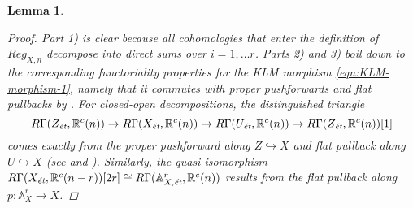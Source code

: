 \documentclass[10pt,a4paper,oneside]{article}
\newcommand{\RR}{\mathbb{R}}
\renewcommand{\AA}{\mathbb{A}}
\newcommand{\et}{\text{\it \'{e}t}}
\theoremstyle{myplain}
\newtheorem{lemma}[theorem]{Lemma}
\theoremstyle{mydefinition}
\numberwithin{equation}{section}
\begin{document}
\begin{lemma}
  \begin{proof}
    Part 1) is clear because all cohomologies that enter the definition of
    $Reg_{X,n}$ decompose into direct sums over $i = 1,\ldots r$.  Parts 2) and
    3) boil down to the corresponding functoriality properties for the KLM
    morphism \eqref{eqn:KLM-morphism-1}, namely that it commutes with proper
    pushforwards and flat pullbacks by
    \cite[Lemma~3 and~4]{Weisschuh-2017}. For closed-open decompositions, the
    distinguished triangle
    \[ R\Gamma (Z_\et, \RR^c (n)) \to R\Gamma (X_\et, \RR^c (n)) \to
      R\Gamma (U_\et, \RR^c (n)) \to R\Gamma (Z_\et, \RR^c (n)) [1] \]
    comes exactly from the proper pushforward along $Z \hookrightarrow X$ and
    flat pullback along $U \hookrightarrow X$ (see
    \cite[Corollary~7.2]{Geisser-2010} and \cite[\S 3]{Bloch-1986}). Similarly,
    the quasi-isomorphism
    $R\Gamma (X_\et, \RR^c (n-r)) [2r] \cong R\Gamma (\AA^r_{X,\et}, \RR^c (n))$
    results from the flat pullback along $p\colon \AA^r_X \to X$.
  \end{proof}
\end{lemma}
\end{document}
